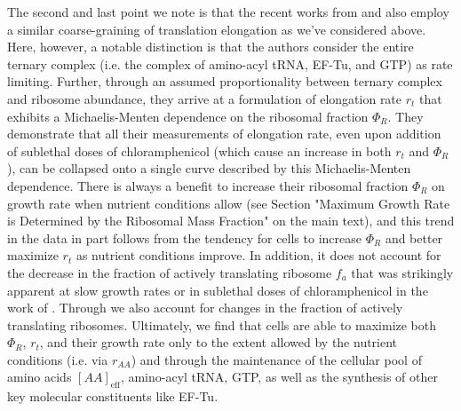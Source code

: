 The second and last point we note is that the recent works from \cite{dai2016}
and \cite{klumpp2013} also employ a similar coarse-graining of translation
elongation as we've considered above. Here, however, a notable distinction is
that the authors consider the entire ternary complex (i.e. the complex of
amino-acyl tRNA, EF-Tu, and GTP) as rate limiting. Further, through an assumed
proportionality between ternary complex and ribosome abundance, they arrive at a
formulation of elongation rate $r_t$ that exhibits a Michaelis-Menten
dependence on the ribosomal fraction $\Phi_R$. They demonstrate that all their
measurements of elongation rate, even upon addition of sublethal doses of
chloramphenicol (which cause an increase in both $r_t$ and $\Phi_R$), can be
collapsed onto a single curve described by this Michaelis-Menten dependence.
There is always a benefit to increase their ribosomal fraction $\Phi_R$ on
growth rate when nutrient conditions allow (see Section "Maximum Growth Rate is Determined by the Ribosomal Mass Fraction" on the main text), and this trend
in the data in part follows from the tendency for cells to increase $\Phi_R$ and
better maximize $r_t$ as nutrient conditions improve.  In addition, it does not
account for the decrease in the fraction of actively translating ribosome $f_a$
that was strikingly apparent at slow growth rates or in sublethal doses of
chloramphenicol in the work of \cite{dai2016}. Through  we also
account for changes in the fraction of actively translating ribosomes.
Ultimately, we find that cells are able to maximize both $\Phi_R$, $r_t$, and
their growth rate  only to the extent allowed by the nutrient conditions (i.e.
via $r_{AA}$) and through the maintenance of the cellular pool of amino acids
$[AA]_\text{eff}$, amino-acyl tRNA, GTP, as well as the synthesis of other key
molecular constituents like EF-Tu.
